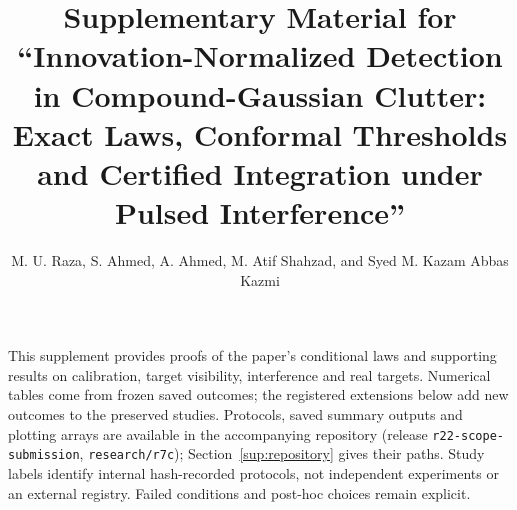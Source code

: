 \documentclass[10pt]{article}
\title{Supplementary Material for ``Innovation-Normalized Detection in Compound-Gaussian Clutter: Exact Laws, Conformal Thresholds and Certified Integration under Pulsed Interference''}
\author{M. U. Raza, S. Ahmed, A. Ahmed, M. Atif Shahzad, and Syed M. Kazam Abbas Kazmi}
\date{}
\begin{document}
\sloppy\maketitle
\noindent This supplement provides proofs of the paper's conditional laws and supporting results on calibration, target visibility, interference and real targets. Numerical tables come from frozen saved outcomes; the registered extensions below add new outcomes to the preserved studies. Protocols, saved summary outputs and plotting arrays are available in the accompanying repository (release \texttt{r22-scope-submission}, \texttt{research/r7c}); Section~\ref{sup:repository} gives their paths. Study labels identify internal hash-recorded protocols, not independent experiments or an external registry. Failed conditions and post-hoc choices remain explicit.
\end{document}

